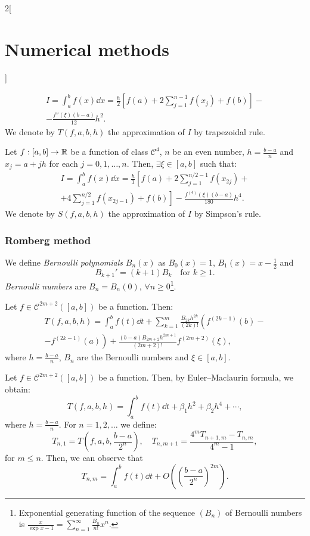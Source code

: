 \documentclass[../../../main.tex]{subfiles}
\begin{document}
\begin{multicols}{2}[\section{Numerical methods}]
\begin{theorem}
    \begin{multline*}
        I=\int_a^bf(x)\dd x=\frac{h}{2}\left[f(a)+2\sum_{j=1}^{n-1}f(x_j)+f(b)\right]-\\-\frac{f''(\xi)(b-a)}{12}h^2.
    \end{multline*}
    We denote by $T(f,a,b,h)$ the approximation of $I$ by trapezoidal rule.
\end{theorem}
\begin{theorem}
    Let $f:[a,b]\rightarrow\mathbb{R}$ be a function of class $\mathcal{C}^4$, $n$ be an even number, $h=\frac{b-a}{n}$ and $x_j=a+jh$ for each $j=0,1,\ldots,n$. Then, $\exists\xi\in[a,b]$ such that:
    \begin{multline*}
        I=\int_a^bf(x)\dd x=\frac{h}{3}\left[f(a)+2\sum_{j=1}^{n/2-1}f(x_{2j})\right.+\\+\left.4\sum_{j=1}^{n/2}f(x_{2j-1})+f(b)\right]-\frac{f^{(4)}(\xi)(b-a)}{180}h^4.
    \end{multline*}
    We denote by $S(f,a,b,h)$ the approximation of $I$ by Simpson's rule.
\end{theorem}
\subsubsection*{Romberg method}
\begin{definition}
    We define \textit{Bernoulli polynomials} $B_n(x)$ as $B_0(x)=1$, $B_1(x)=x-\frac{1}{2}$ and $$B_{k+1}'=(k+1)B_k\quad\text{for }k\geq 1.$$ \textit{Bernoulli numbers} are $B_n=B_n(0)$, $\forall n\geq 0$\footnote{Exponential generating function of the sequence $(B_n)$ of Bernoulli numbers is $\displaystyle\frac{x}{\exp{x}-1}=\sum_{n=1}^\infty\frac{B_n}{n!}x^n$.}.
\end{definition}
\begin{theorem}
    Let $f\in\mathcal{C}^{2m+2}([a,b])$ be a function. Then:
    \begin{multline*}
        T(f,a,b,h)=\int_a^bf(t)\dd t+\sum_{k=1}^m\frac{B_{2k}h^{2k}}{(2k)!}\left(f^{(2k-1)}(b)\right.-\\-\left.f^{(2k-1)}(a)\right)+\frac{(b-a)B_{2m+2}h^{2m+1}}{(2m+2)!}f^{(2m+2)}(\xi),
    \end{multline*}
    where $h=\frac{b-a}{n}$, $B_n$ are the Bernoulli numbers and $\xi\in[a,b]$.
\end{theorem}
\begin{theorem}
    Let $f\in\mathcal{C}^{2m+2}([a,b])$ be a function. Then, by Euler–Maclaurin formula, we obtain: $$T(f,a,b,h)=\int_a^bf(t)\dd t+\beta_1 h^2+\beta_2 h^4+\cdots,$$ where $h=\frac{b-a}{n}$. For $n=1,2,\ldots$ we define: $$T_{n,1}=T\left(f,a,b,\frac{b-a}{2^n}\right),\quad T_{n,m+1}=\frac{4^mT_{n+1,m}-T_{n,m}}{4^m-1},$$ for $m\leq n$. Then, we can observe that $$T_{n,m}=\int_a^bf(t)\dd t+O\left(\left(\frac{b-a}{2^n}\right)^{2m}\right).$$
\end{theorem}

\end{multicols}
\end{document}
